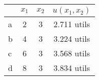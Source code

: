 \begin{tabular}{l|ccc}
\toprule
 & $x_{1}$ & $x_{2}$ & $u\left(x_{1},x_{2}\right)$ \\
\midrule
a & 2 & 3 & 2.711 utils \\
b & 4 & 3 & 3.224 utils \\
c & 6 & 3 & 3.568 utils \\
d & 8 & 3 & 3.834 utils \\
\bottomrule
\end{tabular}
